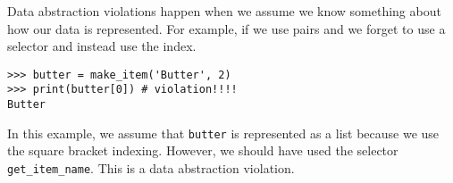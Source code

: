 Data abstraction violations happen when we assume we know something about how
our data is represented. For example, if we use pairs and we forget to use a
selector and instead use the index.

\begin{lstlisting}
>>> butter = make_item('Butter', 2)
>>> print(butter[0]) # violation!!!!
Butter
\end{lstlisting}

In this example, we assume that {\tt butter} is represented as a list because
we use the square bracket indexing. However, we should have used the selector
{\tt get\_item\_name}. This is a data abstraction violation.
